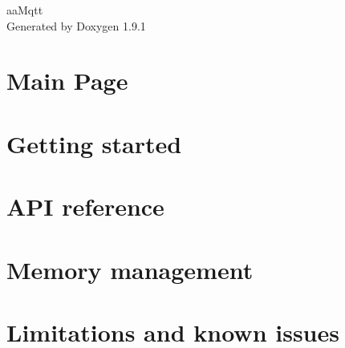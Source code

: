 \let\mypdfximage\pdfximage\def\pdfximage{\immediate\mypdfximage}\documentclass[twoside]{book}
\newcommand{\+}{\discretionary{\mbox{\scriptsize$\hookleftarrow$}}{}{}}
\newcommand{\clearemptydoublepage}{%
  \newpage{\pagestyle{empty}\cleardoublepage}%
}
\begin{document}
\raggedbottom

\hypersetup{pageanchor=false,
             bookmarksnumbered=true,
             pdfencoding=unicode
            }
\begin{titlepage}
\vspace*{7cm}
\begin{center}%
{\Large aa\+Mqtt }\\
\vspace*{1cm}
{\large Generated by Doxygen 1.9.1}\\
\end{center}
\end{titlepage}
\clearemptydoublepage
{}
\tableofcontents
\clearemptydoublepage
{}
\hypersetup{pageanchor=true}

\chapter{Main Page}
\label{index}\hypertarget{index}{}
\chapter{Getting started}
\label{md_lib_async_mqtt_client_master_docs_1___getting_started}

\chapter{API reference}
\label{md_lib_async_mqtt_client_master_docs_2___a_p_i_reference}

\chapter{Memory management}
\label{md_lib_async_mqtt_client_master_docs_3___memory_management}

\chapter{Limitations and known issues}
\label{md_lib_async_mqtt_client_master_docs_4___limitations_and_known_issues}

\end{document}
